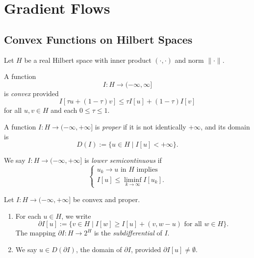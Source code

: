 \section{Gradient Flows}
\label{sec:gradient-flows}

\subsection{Convex Functions on Hilbert Spaces}
\label{sec:convex-functions-hilbert-spaces}

Let $H$ be a real Hilbert space with inner product $(\cdot,\cdot)$ and norm $\|\cdot\|$.

\begin{definition}
\label{def:convex-function-hilbert-space}
A function
\[
I : H \to (-\infty, \infty]
\]
is \textit{convex} provided
\[
I[\tau u + (1-\tau)v] \le \tau I[u] + (1-\tau)I[v]
\]
for all $u, v \in H$ and each $0 \le \tau \le 1$.
\end{definition}

A function $I:H\to(-\infty,+\infty]$ is \textit{proper} if it is not identically $+\infty$, and its domain is
\[
D(I):=\{u\in H\mid I[u]<+\infty\}.
\]

\begin{definition}
\label{def:lower-semicontinuous-hilbert-functional}
We say $I : H \to (-\infty, +\infty]$ is \textit{lower semicontinuous} if
\[
\begin{cases} u_k \to u \text{ in } H \text{ implies} \\ I[u] \le \liminf_{k \to \infty} I[u_k]. \end{cases}
\]
\end{definition}

\begin{definition}[Subdifferential]
\label{def:subdifferential-hilbert}

Let $I : H \to (-\infty, +\infty]$ be convex and proper.
\begin{enumerate}
\item[(i)] For each $u \in H$, we write
\[
\partial I[u] := \{v \in H \mid I[w] \ge I[u] + (v, w-u) \text{ for all } w \in H\}.
\tag{1}
\]
The mapping $\partial I : H \to 2^H$ is the \textit{subdifferential} of $I$.
\item[(ii)] We say $u \in D(\partial I)$, the domain of $\partial I$, provided $\partial I[u] \ne \emptyset$.
\end{enumerate}
\end{definition}

